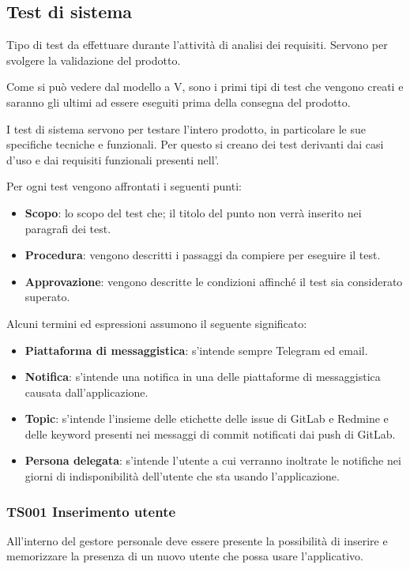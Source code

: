 \subsection{Test di sistema}%
Tipo di test da effettuare durante l'attività di analisi dei requisiti. Servono per svolgere la validazione del prodotto.

Come si può vedere dal modello a V, sono i primi tipi di test che vengono creati e saranno gli ultimi ad essere eseguiti prima della consegna del prodotto.

I test di sistema servono per testare l'intero prodotto, in particolare le sue specifiche tecniche e funzionali.
Per questo si creano dei test derivanti dai casi d'uso e dai requisiti funzionali presenti nell'\AdRd.

Per ogni test vengono affrontati i seguenti punti:

\begin{itemize}
	\item \textbf{Scopo}: lo scopo del test che; il titolo del punto non verrà inserito nei paragrafi dei test. %
	\item \textbf{Procedura}: vengono descritti i passaggi da compiere per eseguire il test.
	\item \textbf{Approvazione}: vengono descritte le condizioni affinché il test sia considerato superato.
\end{itemize}

Alcuni termini ed espressioni assumono il seguente significato:

\begin{itemize}
	\item \textbf{Piattaforma di messaggistica}: s'intende sempre Telegram ed email.
	\item \textbf{Notifica}: s'intende una notifica in una delle piattaforme di messaggistica causata dall'applicazione.
	\item \textbf{Topic}: s'intende l'insieme delle etichette delle issue di GitLab e Redmine e delle keyword presenti nei messaggi di commit notificati dai push di GitLab.
	\item \textbf{Persona delegata}: s'intende l'utente a cui verranno inoltrate le notifiche nei giorni di indisponibilità dell'utente che sta usando l'applicazione. 
\end{itemize}

	\subsubsection{TS001 Inserimento utente}
		All'interno del gestore personale deve essere presente la possibilità di inserire e memorizzare la presenza di un nuovo utente che possa usare l'applicativo.
		
